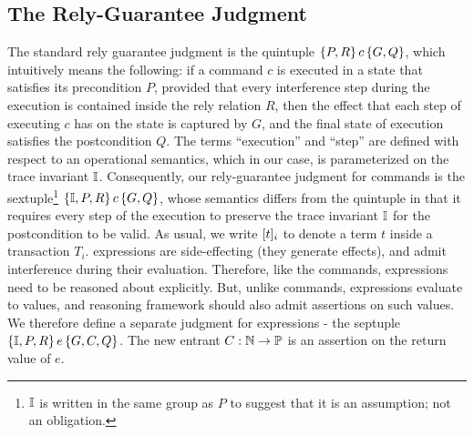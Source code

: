 \subsection{The Rely-Guarantee Judgment}



The standard rely guarantee judgment is the quintuple $\{P,R\}\,c\,\{G,Q\}$,
which intuitively means the following: if a command $c$ is executed in
a state that satisfies its precondition $P$, provided that every
interference step during the execution is contained inside the rely
relation $R$, then the effect that each step of executing $c$ has on
the state is captured by $G$, and the final state of execution
satisfies the postcondition $Q$. The terms ``execution'' and ``step''
are defined with respect to an operational semantics, which in our
case, is parameterized on the trace invariant $\mathbb{I}$. Consequently, our
rely-guarantee judgment for commands is the sextuple\footnote{$\mathbb{I}$ is
written in the same group as $P$ to suggest that it is an assumption;
not an obligation.} $\{\mathbb{I},P,R\}\,c\,\{G,Q\}$, whose semantics differs
from the quintuple in that it requires every step of the execution to
preserve the trace invariant $\mathbb{I}$ for the postcondition to be valid.
As usual, we write $\lbrack t \rbrack_i$ to denote a term $t$ inside a
transaction $T_i$.  \txnimp expressions are side-effecting (they
generate  effects), and admit interference during their
evaluation. Therefore, like the commands, expressions need to be
reasoned about explicitly. But, unlike commands, expressions evaluate
to values, and reasoning framework should also admit assertions on such
values. We therefore define a separate judgment for expressions - the
septuple $\{\mathbb{I},P,R\}\,e\,\{G,C,Q\}$. The new entrant $C : \mathbb{N}
\rightarrow \mathbb{P}$ is an assertion on the return value of $e$.

